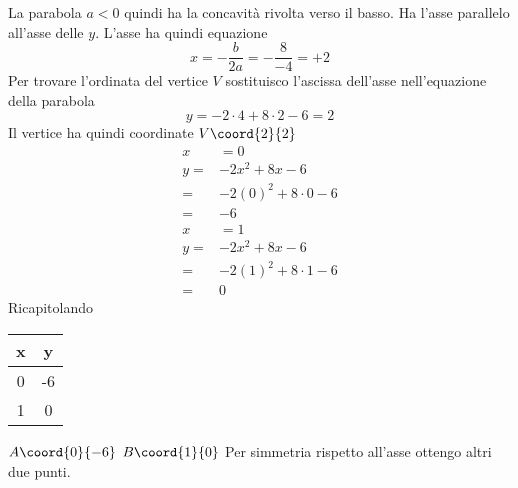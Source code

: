 La parabola $a<0$ quindi ha la concavità rivolta verso il basso. Ha l'asse parallelo all'asse delle $y$. L'asse ha quindi equazione \[x=-\dfrac{b}{2a}=-\dfrac{8}{-4}=+2\]
Per trovare l'ordinata del vertice $V$ sostituisco l'ascissa dell'asse nell'equazione della parabola\[y=-2\cdot4+8\cdot2-6=2\]
Il vertice ha quindi coordinate $V\coord{2}{2}$
\begin{align*}
	x&=0\\
	y=&-2x^2+8x-6\\
	=&-2(0)^2+8\cdot0 -6\\
	=&-6
\end{align*}
\begin{align*}
	x&=1\\
	y=&-2x^2+8x-6\\
	=&-2(1)^2+8\cdot1 -6\\
	=&0
\end{align*}
Ricapitolando
\begin{tabular}{c|c}
	x & y\\
	\hline 
	0& -6 \\ 
	1&0  \\ 
\end{tabular}

$A\coord{0}{-6}$ $B\coord{1}{0}$ Per simmetria rispetto all'asse ottengo altri due punti.
\begin{center}
	
	\label{fig:disegnoparabola2}
\end{center}
